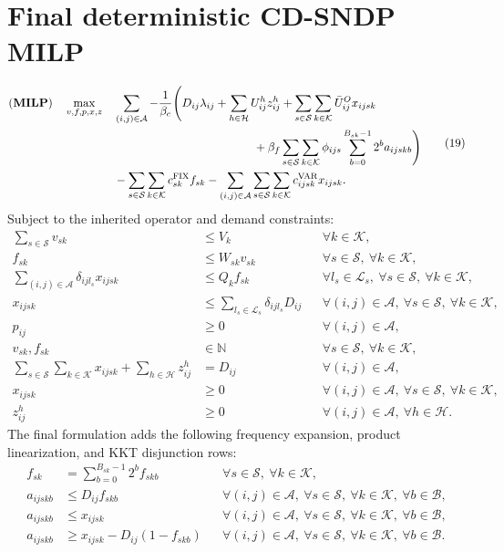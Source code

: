 \documentclass{article}
\begin{document}
\section*{Final deterministic CD-SNDP MILP}
\begin{equation}
\begin{aligned}
(\mathbf{MILP})\quad \max_{v,f,p,x,z}\quad
&\sum_{(i,j)\in\mathcal A}-\frac{1}{\beta_c}\Biggl(
D_{ij}\lambda_{ij}+\sum_{h\in\mathcal H}U_{ij}^{h}z_{ij}^{h}
+\sum_{s\in\mathcal S}\sum_{k\in\mathcal K}\bar U_{ij}^{O}x_{ijsk}\\
&\hspace{42mm}+\beta_f\sum_{s\in\mathcal S}\sum_{k\in\mathcal K}\phi_{ijs}
\sum_{b=0}^{B_{sk}-1}2^b a_{ijskb}\Biggr)\\
&-\sum_{s\in\mathcal S}\sum_{k\in\mathcal K}c_{sk}^{\mathrm{FIX}}f_{sk}
-\sum_{(i,j)\in\mathcal A}\sum_{s\in\mathcal S}\sum_{k\in\mathcal K}c_{ijsk}^{\mathrm{VAR}}x_{ijsk}.
\end{aligned}\tag{19}
\end{equation}
Subject to the inherited operator and demand constraints:
\begin{align}
\sum_{s\in\mathcal S}v_{sk}&\leq V_k
&&\forall k\in\mathcal K,\tag{2}\\
f_{sk}&\leq W_{sk}v_{sk}
&&\forall s\in\mathcal S,\ \forall k\in\mathcal K,\tag{3}\\
\sum_{(i,j)\in\mathcal A}\delta_{ijl_s}x_{ijsk}&\leq Q_k f_{sk}
&&\forall l_s\in\mathcal L_s,\ \forall s\in\mathcal S,\ \forall k\in\mathcal K,\tag{4}\\
x_{ijsk}&\leq\sum_{l_s\in\mathcal L_s}\delta_{ijl_s}D_{ij}
&&\forall(i,j)\in\mathcal A,\ \forall s\in\mathcal S,\ \forall k\in\mathcal K,\tag{5}\\
p_{ij}&\geq0
&&\forall(i,j)\in\mathcal A,\tag{6}\\
v_{sk},f_{sk}&\in\mathbb N
&&\forall s\in\mathcal S,\ \forall k\in\mathcal K,\tag{7}\\
\sum_{s\in\mathcal S}\sum_{k\in\mathcal K}x_{ijsk}
+\sum_{h\in\mathcal H}z_{ij}^{h}&=D_{ij}
&&\forall(i,j)\in\mathcal A,\tag{9}\\
x_{ijsk}&\geq0
&&\forall(i,j)\in\mathcal A,\ \forall s\in\mathcal S,\ \forall k\in\mathcal K,\tag{10}\\
z_{ij}^{h}&\geq0
&&\forall(i,j)\in\mathcal A,\ \forall h\in\mathcal H.\tag{11}
\end{align}
The final formulation adds the following frequency expansion, product linearization, and KKT disjunction rows:
\begin{align}
f_{sk}&=\sum_{b=0}^{B_{sk}-1}2^b f_{skb}
&&\forall s\in\mathcal S,\ \forall k\in\mathcal K,\tag{20}\\
a_{ijskb}&\leq D_{ij}f_{skb}
&&\forall(i,j)\in\mathcal A,\ \forall s\in\mathcal S,\ \forall k\in\mathcal K,\ \forall b\in\mathcal B,\tag{21}\\
a_{ijskb}&\leq x_{ijsk}
&&\forall(i,j)\in\mathcal A,\ \forall s\in\mathcal S,\ \forall k\in\mathcal K,\ \forall b\in\mathcal B,\tag{22}\\
a_{ijskb}&\geq x_{ijsk}-D_{ij}(1-f_{skb})
&&\forall(i,j)\in\mathcal A,\ \forall s\in\mathcal S,\ \forall k\in\mathcal K,\ \forall b\in\mathcal B.\tag{23}
\end{align}
\end{document}
